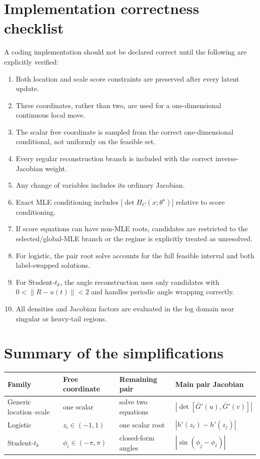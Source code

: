 \documentclass[11pt]{article}
\newcommand{\1}{\mathbf{1}}
\begin{document}
\section{Implementation correctness checklist}

A coding implementation should not be declared correct until the following are explicitly verified:
\begin{enumerate}[leftmargin=*]
    \item Both location and scale score constraints are preserved after every latent update.
    \item Three coordinates, rather than two, are used for a one-dimensional continuous local move.
    \item The scalar free coordinate is sampled from the correct one-dimensional conditional, not uniformly on the feasible set.
    \item Every regular reconstruction branch is included with the correct inverse-Jacobian weight.
    \item Any change of variables includes its ordinary Jacobian.
    \item Exact MLE conditioning includes $|\det H_C(x;\theta^\star)|$ relative to score conditioning.
    \item If score equations can have non-MLE roots, candidates are restricted to the selected/global-MLE branch or the regime is explicitly treated as unresolved.
    \item For logistic, the pair root solve accounts for the full feasible interval and both label-swapped solutions.
    \item For Student-$t_k$, the angle reconstruction uses only candidates with $0<\|R-u(t)\|<2$ and handles periodic angle wrapping correctly.
    \item All densities and Jacobian factors are evaluated in the log domain near singular or heavy-tail regions.
\end{enumerate}

\section{Summary of the simplifications}

\begin{center}
\begin{tabular}{@{}llll@{}}
\toprule
Family & Free coordinate & Remaining pair & Main pair Jacobian \\
\midrule
Generic location--scale & one scalar & solve two equations & $|\det[\bar G'(u),\bar G'(v)]|$ \\
Logistic & $z_i\in(-1,1)$ & one scalar root & $|h'(z_\ell)-h'(z_j)|$ \\
Student-$t_k$ & $\phi_i\in(-\pi,\pi)$ & closed-form angles & $|\sin(\phi_j-\phi_\ell)|$ \\
\bottomrule
\end{tabular}
\end{center}
\end{document}
